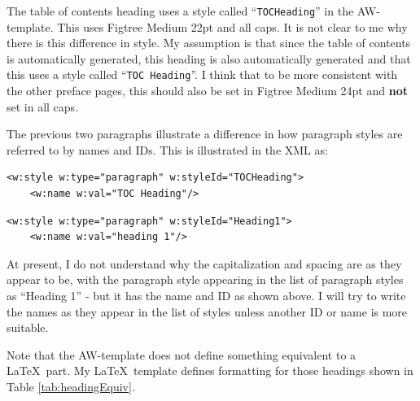 \documentclass[12pt, twoside]{article}
\begin{document}
The table of contents heading uses a style called \enquote{\texttt{TOCHeading}} in the AW-template. This uses Figtree Medium 22pt and all caps. It is not clear to me why there is this difference in style. My assumption is that since the table of contents is automatically generated, this heading is also automatically generated and that this uses a style called \enquote{\texttt{TOC Heading}}. I think that to be more consistent with the other preface pages, this should also be set in Figtree Medium 24pt and \textbf{not} set in all caps.

The previous two paragraphs illustrate a difference in how paragraph styles are referred to by names and IDs. This is illustrated in the \gls{XML} as:
\begin{lstlisting}[style=OOXML, caption={Two lines of the TOCHeading paragraph style}, label=lst:TOCHeadingTwoLines]
  <w:style w:type="paragraph" w:styleId="TOCHeading">
    <w:name w:val="TOC Heading"/>
\end{lstlisting}

\begin{lstlisting}[style=OOXML, caption={Two lines of the Heading 1 paragraph style}, label=lst:Heading1TwoLines]
  <w:style w:type="paragraph" w:styleId="Heading1">
    <w:name w:val="heading 1"/>
\end{lstlisting}

At present, I do not understand why the capitalization and spacing are as they appear to be, with the paragraph style appearing in the list of paragraph styles as \enquote{Heading 1} - but it has the name and ID as shown above. I will try to write the names as they appear in the list of styles unless another ID or name is more suitable.


Note that the AW-template does not define something equivalent to a \LaTeX\ part. My \LaTeX\ template defines formatting for those headings shown in Table \ref{tab:headingEquiv}.

\end{document}
